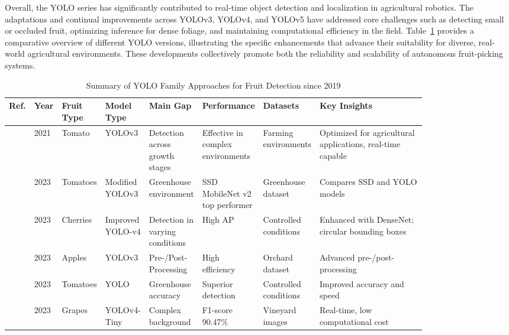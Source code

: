 \documentclass[a4paper,fleqn]{cas-dc}
\begin{document}
Overall, the YOLO series has significantly contributed to real-time object detection and localization in agricultural robotics. The adaptations and continual improvements across YOLOv3, YOLOv4, and YOLOv5 have addressed core challenges such as detecting small or occluded fruit, optimizing inference for dense foliage, and maintaining computational efficiency in the field. Table~\ref{tab:yolo-based} provides a comparative overview of different YOLO versions, illustrating the specific enhancements that advance their suitability for diverse, real-world agricultural environments. These developments collectively promote both the reliability and scalability of autonomous fruit-picking systems.

\begin{table}[H]
	\centering
	\footnotesize 
	\caption{Summary of YOLO Family Approaches for Fruit Detection since 2019} 
	\label{tab:yolo-based} 
	\begin{tabular}{p{0.03\linewidth} p{0.03\linewidth} p{0.06\linewidth} p{0.06\linewidth} p{0.12\linewidth} p{0.12\linewidth} p{0.12\linewidth} p{0.28\linewidth}}
	\toprule
	\textbf{Ref.} & \textbf{Year} & \textbf{Fruit Type} & \textbf{Model Type} & \textbf{Main Gap} & \textbf{Performance} & \textbf{Datasets} & \textbf{Key Insights} \\ \midrule
\cite{liu2020yolo}  & 2021 & Tomato & YOLOv3 & Detection across growth stages & Effective in complex environments & Farming environments & Optimized for agricultural applications, real-time capable \\ \midrule
\cite{lawal2021tomato} & 2023 & Tomatoes & Modified YOLOv3 & Greenhouse environment & SSD MobileNet v2 top performer & Greenhouse dataset & Compares SSD and YOLO models \\ \midrule
\cite{gai2023detection} & 2023 & Cherries & Improved YOLO-v4 & Detection in varying conditions & High AP & Controlled conditions & Enhanced with DenseNet; circular bounding boxes \\ \midrule
\cite{kuznetsova2020using} & 2023 & Apples & YOLOv3 & Pre-/Post-Processing & High efficiency & Orchard dataset & Advanced pre-/post-processing \\ \midrule
\cite{magalhaes2021evaluating} & 2023 & Tomatoes & YOLO & Greenhouse accuracy & Superior detection & Controlled conditions & Improved accuracy and speed \\ \midrule
\cite{li2021real} & 2023 & Grapes & YOLOv4-Tiny & Complex background & F1-score 90.47\% & Vineyard images & Real-time, low computational cost \\ \midrule

\end{tabular}
\end{table}
\end{document}

